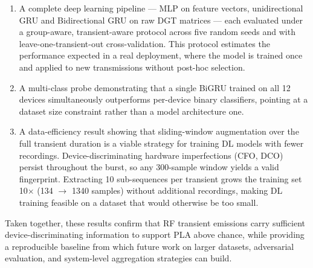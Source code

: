 \begin{enumerate}
  \item A complete deep learning pipeline — MLP on feature vectors, unidirectional GRU and Bidirectional GRU on raw DGT matrices — each evaluated under a group-aware, transient-aware protocol across five random seeds and with leave-one-transient-out cross-validation. This protocol estimates the performance expected in a real deployment, where the model is trained once and applied to new transmissions without post-hoc selection.
  \item A multi-class probe demonstrating that a single BiGRU trained on all 12 devices simultaneously outperforms per-device binary classifiers, pointing at a dataset size constraint rather than a model architecture one.
  \item A data-efficiency result showing that sliding-window augmentation over the full transient duration is a viable strategy for training DL models with fewer recordings. Device-discriminating hardware imperfections (CFO, DCO) persist throughout the burst, so any 300-sample window yields a valid fingerprint. Extracting 10 sub-sequences per transient grows the training set 10$\times$ (134 $\to$ 1340 samples) without additional recordings, making DL training feasible on a dataset that would otherwise be too small.
\end{enumerate}

Taken together, these results confirm that RF transient emissions carry
sufficient device-discriminating information to support PLA above chance,
while providing a reproducible baseline from which future work on larger datasets,
adversarial evaluation, and system-level aggregation strategies can build.

